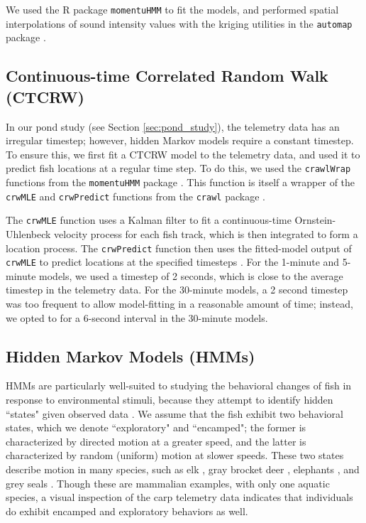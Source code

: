 \documentclass[12pt]{article}
\begin{document}
	 We used the R package \texttt{momentuHMM} \cite{McClintock2018} to fit the models, and performed spatial interpolations of sound intensity values with the kriging utilities in the \texttt{automap} package \cite{automap}.

	\subsection{Continuous-time Correlated Random Walk (CTCRW)}
	
		In our pond study (see Section \ref{sec:pond_study}), the telemetry data has an irregular timestep; however, hidden Markov models require a constant timestep. To ensure this, we first fit a CTCRW model to the telemetry data, and used it to predict fish locations at a regular time step. To do this, we used the \texttt{crawlWrap} functions from the \texttt{momentuHMM} package \cite{McClintock2018}. This function is itself a wrapper of the \texttt{crwMLE} and \texttt{crwPredict} functions from the \texttt{crawl} package \cite{crawl}.
		
		The \texttt{crwMLE} function uses a Kalman filter to fit a continuous-time Ornstein-Uhlenbeck velocity process for each fish track, which is then integrated to form a location process. The \texttt{crwPredict} function then uses the fitted-model output of \texttt{crwMLE} to predict locations at the specified timesteps \cite{crawl, Johnson2008}. For the 1-minute and 5-minute models, we used a timestep of 2 seconds, which is close to the average timestep in the telemetry data. For the 30-minute models, a 2 second timestep was too frequent to allow model-fitting in a reasonable amount of time; instead, we opted to for a 6-second interval in the 30-minute models.

	\subsection{Hidden Markov Models (HMMs)}
	
		HMMs are particularly well-suited to studying the behavioral changes of fish in response to environmental stimuli, because they attempt to identify hidden ``states" given observed data \cite{Rabiner1989}. We assume that the fish exhibit two behavioral states, which we denote ``exploratory" and ``encamped"; the former is characterized by directed motion at a greater speed, and the latter is characterized by random (uniform) motion at slower speeds. These two states describe motion in many species, such as elk \cite{Morales2004, Fryxell2008}, gray brocket deer \cite{Grotta-Neto2019}, elephants \cite{Roever2014, Vogel2019}, and grey seals \cite{Breed2009}. Though these are mammalian examples, with only one aquatic species, a visual inspection of the carp telemetry data indicates that individuals do exhibit encamped and exploratory behaviors as well.
		
\end{document}
